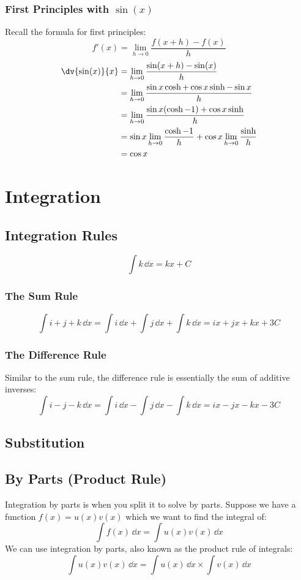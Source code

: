 \documentclass[a4paper]{article}
\theoremstyle{plain}
\theoremstyle{definition}
\theoremstyle{remark}
\newcommand{\sectionSpace}{\vspace{2em}} %
\newcommand{\subsectionSpace}{\vspace{0.5em}}
\begin{document}
        \subsubsection{First Principles with $\sin(x)$}
        Recall the formula for first principles:
        \[f'(x) = \lim_{h \to 0} \frac{f(x+h) - f(x)}{h}\]
        \begin{align}
            \dv{\sin(x)}{x} & = \lim_{h \to 0} \frac{\sin(x+h) - \sin(x)}{h} \\
            & = \lim_{h \to 0} \frac{\sin{x}\cosh + \cos{x}\sinh - \sin{x}}{h} \\
            & = \lim_{h \to 0} \frac{\sin{x}(\cosh - 1) + \cos{x}\sinh}{h} \\
            & = \sin{x}\lim_{h \to 0}\frac{\cosh - 1}{h} + \cos{x}\lim_{h \to 0} \frac{\sinh}{h} \\
            & = \cos{x}
        \end{align}


\sectionSpace
\section{Integration}
    \subsection{Integration Rules}
    $$\int k\,\dd{x} = kx + C$$
        \subsubsection{The Sum Rule}
        $$\int i + j + k\,\dd{x} = \int i\,\dd{x} + \int j\,\dd{x} + \int k\,\dd{x} = ix + jx + kx + 3C$$

        \subsubsection{The Difference Rule}
        Similar to the sum rule, the difference rule is essentially the sum of additive inverses:
        $$\int i - j - k\,\dd{x} = \int i\,\dd{x} - \int j\,\dd{x} - \int k\,\dd{x} = ix - jx - kx - 3C$$

    \subsectionSpace
    \subsection{Substitution}
    
    \subsectionSpace
    \subsection{By Parts (Product Rule)}
    Integration by parts is when you split it to solve by parts. Suppose we have a function $f(x) = u(x)v(x)$ which we want to find the integral of:
    $$\int f(x) \,\dd{x} = \int u(x)v(x) \,\dd{x}$$
    We can use integration by parts, also known as the product rule of integrals:
    $$\int u(x)v(x)\,\dd{x} = \int u(x)\,\dd{x}\times \int v(x)\,\dd{x}$$
\end{document}
